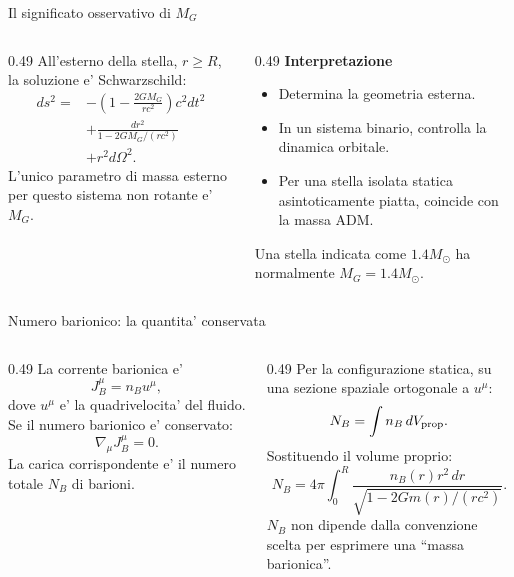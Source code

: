 \begin{frame}{Il significato osservativo di $M_G$}
\small
\begin{columns}[T,onlytextwidth]
\begin{column}{0.49\textwidth}
All'esterno della stella, $r\geq R$,
la soluzione e' Schwarzschild:
\[
\begin{aligned}
ds^2={}&-\left(1-\frac{2GM_G}{rc^2}\right)c^2dt^2\\
&+\frac{dr^2}{1-2GM_G/(rc^2)}\\
&+r^2d\Omega^2.
\end{aligned}
\]
L'unico parametro di massa esterno
per questo sistema non rotante e' $M_G$.
\end{column}
\begin{column}{0.49\textwidth}
\textbf{Interpretazione}
\begin{itemize}
\item Determina la geometria esterna.
\item In un sistema binario, controlla la dinamica orbitale.
\item Per una stella isolata statica asintoticamente piatta,
coincide con la massa ADM.
\end{itemize}
\medskip
Una stella indicata come $1.4M_\odot$
ha normalmente $M_G=1.4M_\odot$.
\end{column}
\end{columns}
\end{frame}

\begin{frame}{Numero barionico: la quantita' conservata}
\small
\begin{columns}[T,onlytextwidth]
\begin{column}{0.49\textwidth}
La corrente barionica e'
\[
J_B^\mu=n_Bu^\mu,
\]
dove $u^\mu$ e' la quadrivelocita'
del fluido.
\medskip
Se il numero barionico e' conservato:
\[
\nabla_\mu J_B^\mu=0.
\]
La carica corrispondente e' il numero totale
$N_B$ di barioni.
\end{column}
\begin{column}{0.49\textwidth}
Per la configurazione statica, su una
sezione spaziale ortogonale a $u^\mu$:
\[
N_B=\int n_B\,dV_{\rm prop}.
\]
Sostituendo il volume proprio:
\[
N_B=4\pi\int_0^R
\frac{n_B(r)r^2\,dr}
{\sqrt{1-2Gm(r)/(rc^2)}}.
\]
\medskip
$N_B$ non dipende dalla convenzione scelta
per esprimere una ``massa barionica''.
\end{column}
\end{columns}
\end{frame}

